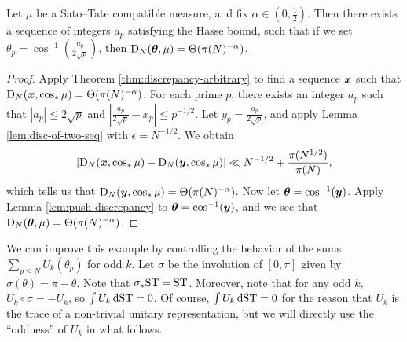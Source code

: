 \begin{theorem}\label{thm:integral-a_p-alpha}
Let $\mu$ be a Sato--Tate compatible measure, and fix 
$\alpha\in \left(0,\frac 1 2\right)$. 
Then there exists a sequence of integers $a_p$ satisfying the Hasse bound, 
such that if we set $\theta_p = \cos^{-1}\left(\frac{a_p}{2\sqrt p}\right)$, 
then $\operatorname{D}_N({\boldsymbol\theta},\mu) = \Theta(\pi(N)^{-\alpha})$. 
\end{theorem}
\begin{proof}
Apply Theorem \ref{thm:discrepancy-arbitrary} to find a sequence ${\boldsymbol x}$ such 
that $\operatorname{D}_N({\boldsymbol x},\cos_\ast \mu) = \Theta(\pi(N)^{-\alpha})$. For each prime 
$p$, there exists an integer $a_p$ such that $|a_p|\leqslant 2\sqrt p$ and 
$\left| \frac{a_p}{2\sqrt p} - x_p\right| \leqslant p^{-1/2}$. Let 
$y_p = \frac{a_p}{2\sqrt p}$, and apply Lemma \ref{lem:disc-of-two-seq} with 
$\epsilon = N^{-1/2}$. We obtain 
\[
	\left| \operatorname{D}_N({\boldsymbol x},\cos_\ast \mu) - \operatorname{D}_N({\boldsymbol y}, \cos_\ast \mu)\right| \ll  N^{-1/2} + \frac{\pi(N^{1/2})}{\pi(N)} ,
\]
which tells us that $\operatorname{D}_N({\boldsymbol y},\cos_\ast\mu) = \Theta(\pi(N)^{-\alpha})$. 
Now let ${\boldsymbol\theta} = \cos^{-1}({\boldsymbol y})$. Apply Lemma \ref{lem:push-discrepancy} to 
${\boldsymbol\theta} = \cos^{-1}({\boldsymbol y})$, and we see that 
$\operatorname{D}_N({\boldsymbol\theta},\mu) = \Theta(\pi(N)^{-\alpha})$. 
\end{proof}

We can improve this example by controlling the behavior of the sums 
$\sum_{p\leqslant N} U_k(\theta_p)$ for odd $k$. Let $\sigma$ be 
the involution of $[0,\pi]$ given by $\sigma(\theta) = \pi-\theta$. Note that 
$\sigma_\ast \mathrm{ST} = \mathrm{ST}$. Moreover, note that for any odd $k$, 
$U_k\circ\sigma = - U_k$, so $\int U_k\, \mathrm{d}\mathrm{ST} = 0$. Of course, 
$\int U_k \,\mathrm{d}\mathrm{ST} = 0$ for the reason that $U_k$ is the trace of a 
non-trivial unitary representation, but we will directly use the ``oddness'' 
of $U_k$ in what follows.


